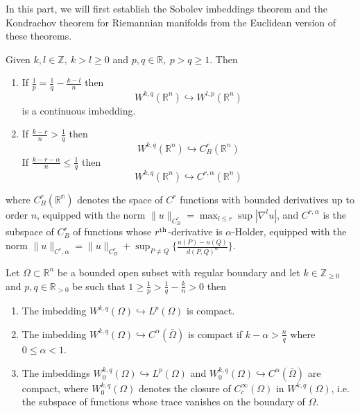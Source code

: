 In this part, we will first establish the Sobolev imbeddings theorem and the Kondrachov
theorem for Riemannian manifolds from the Euclidean version of these theorems.

\begin{theorem}
\label{thm:Sobolev-Rn}
Given \(k,l\in \mathbb{Z},\ k>l \geq 0\) and \(p,q\in \mathbb{R},\ p>q\geq 1\). Then
\begin{enumerate}
\item If \(\frac{1}{p}= \frac{1}{q} - \frac{k-l}{n}\) then 
\[
    W^{k,q}(\mathbb{R}^n) \hookrightarrow W^{l,p}(\mathbb{R}^n)
   \] is a continuous imbedding.
\item If \(\frac{k-r}{n}> \frac{1}{q}\) then
\[
   W^{k,q}(\mathbb{R}^n) \hookrightarrow C^r_B(\mathbb{R}^n)
   \]
If \(\frac{k-r-\alpha}{n}\leq \frac{1}{q}\) then 
\[ 
   W^{k,q}(\mathbb{R}^n) \hookrightarrow C^{r,\alpha}(\mathbb{R}^n) 
   \]
\end{enumerate}
where \(C^r_B(\mathbb{R^n})\) denotes the space of \(C^r\) functions with bounded
derivatives up to order \(n\), equipped with the norm \(\| u \|_{C^r_B} = \max_{l\leq
r}\sup|\nabla^l u|\), and \(C^{r,\alpha}\) is the subspace of \(C^r_B\) of functions
whose \(r^{\rm th}\)-derivative is \(\alpha\)-Holder, equipped with the norm \(\|
u\|_{C^r,\alpha} = \| u \|_{C^r_B} + \sup_{P\ne Q}\{ \frac{u(P) - u(Q)}{d(P,Q)^\alpha} \}\).
\end{theorem}

\begin{theorem}
\label{thm:Kondrachov-Rn}
Let \(\Omega\subset \mathbb{R}^n\) be a bounded open subset with regular boundary and
let \(k\in \mathbb{Z}_{\geq 0}\) and \(p,q\in \mathbb{R}_{>0}\) be such that
\(1\geq \frac{1}{p} > \frac{1}{q} - \frac{k}{n} > 0\) then
\begin{enumerate}
\item The imbedding \(W^{k,q}(\Omega) \hookrightarrow  L^p(\Omega)\) is compact.
\item The imbedding \(W^{k,q}(\Omega) \hookrightarrow  C^\alpha(\bar\Omega)\) is compact if
\(k-\alpha > \frac{n}{q}\) where \(0\leq \alpha < 1\).
\item The imbeddings \(W_0^{k,q}(\Omega) \hookrightarrow  L^p(\Omega)\) and \(W_0^{k,q}(\Omega) \hookrightarrow C^\alpha(\bar\Omega)\) are compact, where \(W_0^{k,q}(\Omega)\) denotes the closure of \(C_c^\infty(\Omega)\) in \(W^{k,q}(\Omega)\), i.e. the subspace of functions whose trace vanishes on the boundary
of \(\Omega\).
\end{enumerate}
\end{theorem}

